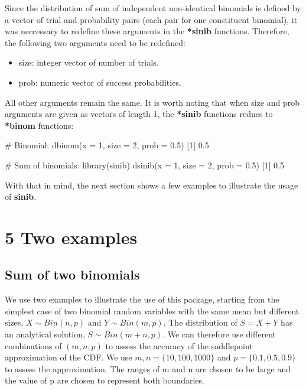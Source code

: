 Since the distribution of sum of independent non-identical binomials is defined by a vector of trial and probability pairs (each pair for one constituent binomial), it was neccessary to redefine these arguments in the \textbf{*sinib} functions. Therefore, the following two arguments need to be redefined:

\begin{itemize}
\item size: integer vector of number of trials. 
\item prob: numeric vector of success probabilities.
\end{itemize}

All other arguments remain the same. It is worth noting that when size and prob arguments are given as vectors of length 1, the \textbf{*sinib} functions redues to \textbf{*binom} functions: 

\begin{example}
# Binomial:
dbinom(x = 1, size = 2, prob = 0.5)
[1] 0.5


# Sum of binomials:
library(sinib)
dsinib(x = 1, size = 2, prob = 0.5)
[1] 0.5
\end{example}

With that in mind, the next section shows a few examples to illustrate the usage of \textbf{sinib}. 

\section{5 Two examples}
\subsection{Sum of two binomials}
We use two examples to illustrate the use of this package, starting from the simplest case of two binomial random variables with the same mean but different sizes, $X \sim Bin(n,p)$ and $Y \sim Bin(m,p)$. The distribution of $S = X+Y$ has an analytical solution, $S \sim Bin(m+n,p)$. We can therefore use different combinations of $(m,n,p)$ to assess the accuracy of the saddlepoint approximation of the CDF. We use $m,n = \{10, 100, 1000\}$ and $p = \{0.1, 0.5, 0.9\}$ to assess the approximation. The ranges of m and n are chosen to be large and the value of p are chosen to represent both boundaries. 


